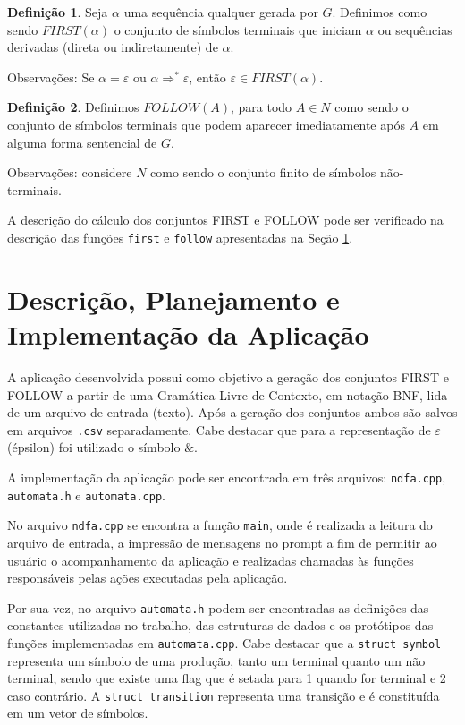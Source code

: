 \documentclass[12pt]{article}
\theoremstyle{definition}
\newtheorem{defn}{Definição}[section]
\begin{document}
\begin{defn}
Seja $\alpha$ uma sequência qualquer gerada por $G$. Definimos como sendo $FIRST(\alpha)$ o conjunto de símbolos terminais que iniciam $\alpha$ ou sequências derivadas (direta ou indiretamente) de $\alpha.$
\end{defn}

Observações: Se $\alpha=\varepsilon$ ou $\alpha \Rightarrow^* \varepsilon$, então $\varepsilon \in FIRST(\alpha)$. \newline

\begin{defn}
Definimos $FOLLOW(A)$, para todo $A \in N$ como sendo o conjunto de símbolos terminais que podem aparecer imediatamente após $A$ em alguma forma sentencial de $G$.
\end{defn}

Observações: considere $N$ como sendo o conjunto finito de símbolos não-terminais.

A descrição do cálculo dos conjuntos FIRST e FOLLOW pode ser verificado na descrição das funções \texttt{first} e \texttt{follow} apresentadas na Seção \ref{3}.

\section{Descrição, Planejamento e Implementação da Aplicação}
\label{3}

A aplicação desenvolvida possui como objetivo a geração dos conjuntos FIRST e FOLLOW a partir de uma Gramática Livre de Contexto, em notação BNF, lida de um arquivo de entrada (texto). Após a geração dos conjuntos ambos são salvos em arquivos \texttt{.csv} separadamente. Cabe destacar que para a representação de $\varepsilon$ (épsilon) foi utilizado o símbolo $\&$.

A implementação da aplicação pode ser encontrada em três arquivos: \texttt{ndfa.cpp}, \texttt{automata.h} e \texttt{automata.cpp}.

No arquivo \texttt{ndfa.cpp} se encontra a função \texttt{main}, onde é realizada a leitura do arquivo de entrada, a impressão de mensagens no prompt a fim de permitir ao usuário o acompanhamento da aplicação e realizadas chamadas às funções responsáveis pelas ações executadas pela aplicação.

Por sua vez, no arquivo \texttt{automata.h} podem ser encontradas as definições das constantes utilizadas no trabalho, das estruturas de dados e os protótipos das funções implementadas em \texttt{automata.cpp}. Cabe destacar que a \texttt{struct symbol} representa um símbolo de uma produção, tanto um terminal quanto um não terminal, sendo que existe uma flag que é setada para 1 quando for terminal e 2 caso contrário. A \texttt{struct transition} representa uma transição e é constituída em um vetor de símbolos.
\end{document}
